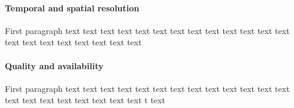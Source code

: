 \documentclass[twocolumn, 10pt, a4paper]{memoir}
\begin{document}
	\paragraph{Temporal and spatial resolution}
	First paragraph
	text text text text text text text text text text text text text text text text text text text text text
	\paragraph{Quality and availability}
	First paragraph
	text text text text text text text text text text text text text text text text text text text text text
	t text
	
	
	
\end{document}
